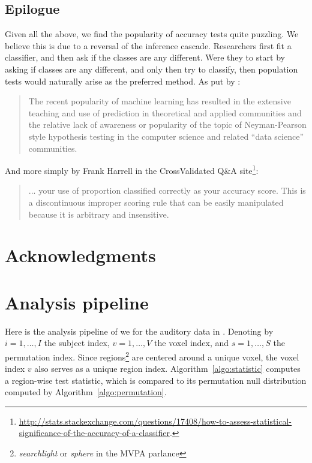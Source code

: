 \documentclass[12pt,a4paper]{article}
\theoremstyle{definition}
\begin{document}
\subsection{Epilogue}
Given all the above, we find the popularity of accuracy tests quite puzzling. 
We believe this is due to a reversal of the inference cascade. 
Researchers first fit a classifier, and then ask if the classes are any different.
Were they to start by asking if classes are any different, and only then try to classify, then population tests would naturally arise as the preferred method. 
As put by \cite{ramdas_classification_2016}:
\begin{quote}
The recent popularity of machine learning has resulted in the extensive teaching and use
of prediction in theoretical and applied communities and the relative lack of awareness or
popularity of the topic of Neyman-Pearson style hypothesis testing in the computer science
and related ``data science'' communities.
\end{quote}
And more simply by Frank Harrell in the \textsf{CrossValidated} Q\&A site\footnote{\url{http://stats.stackexchange.com/questions/17408/how-to-assess-statistical-significance-of-the-accuracy-of-a-classifier}.}:
\begin{quote}
 ... your use of proportion classified correctly as your accuracy score. This is a discontinuous improper scoring rule that can be easily manipulated because it is arbitrary and insensitive.
\end{quote}






\section{Acknowledgments}




\newpage



\appendix


\newpage

\section{Analysis pipeline}
\label{apx:analysis}

Here is the analysis pipeline of \cite{stelzer_statistical_2013} we for the auditory data in \cite{gilron_quantifying_2016}.
Denoting by 
$i=1,\dots,I$ the subject index, 
$v=1,\dots,V$ the voxel index, and 
$s = 1,\dots,S$ the permutation index. 
Since regions\footnote{\emph{searchlight} or \emph{sphere} in the MVPA parlance} are centered around a unique voxel, the voxel index $v$ also serves as a unique region index.
Algorithm~\ref{algo:statistic} computes a region-wise test statistic, which is compared to its permutation null distribution computed by Algorithm~\ref{algo:permutation}.
\end{document}
